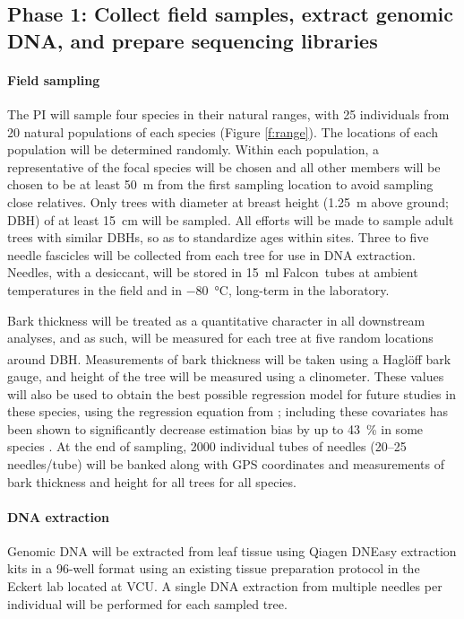 \subsection*{Phase 1: Collect field samples, extract genomic DNA, and prepare sequencing libraries}

\paragraph{Field sampling}

The PI will sample four species in their natural ranges, with 25 individuals from 20 natural populations of each 
species (Figure \ref{f:range}).  The locations of each population will be determined randomly.  Within each population, a representative 
of the focal species will be chosen and all other members will be chosen to be at least \SI{50}{m} from the first sampling 
location to avoid sampling close relatives.  Only trees with diameter at breast height (\SI{1.25}{m} above ground; DBH) of at least 
\SI{15}{cm} will be sampled. All efforts will be made to sample adult trees with similar DBHs, so as to standardize ages within sites.
Three to five needle fascicles will be collected from each tree for use in DNA extraction.  Needles, with a desiccant, 
will be stored in \SI{15}{\ml} Falcon\texttrademark\ tubes  at ambient temperatures in the field and in \SI{-80}{\celsius}, 
long-term in the laboratory.  

Bark thickness will be treated as a quantitative character in all downstream analyses, and as such, will be measured for each tree at five 
random locations around DBH.  Measurements of bark thickness will be taken using a 
Hagl\"{o}ff\textsuperscript{\textregistered} bark gauge, and height of the tree will be measured using a clinometer.  These values 
will also be used to obtain the best possible regression model for future studies in these species, using the 
regression equation from \citet{Cao:1986th}; including these covariates has been shown to significantly decrease estimation
bias by up to \SI{43}{\percent} in some species \citep{Li:2010bl}.  At the end of sampling, \num{2000} individual tubes of 
needles (20--25 needles/tube) will be banked along with GPS coordinates and measurements of bark thickness and height 
for all trees for all species.

\paragraph{DNA extraction}
Genomic DNA will be extracted from leaf tissue using Qiagen DNEasy extraction kits in a 96-well format using an existing 
tissue preparation protocol in the Eckert lab located at VCU.  A single DNA extraction from multiple needles per individual 
will be performed for each sampled tree.

